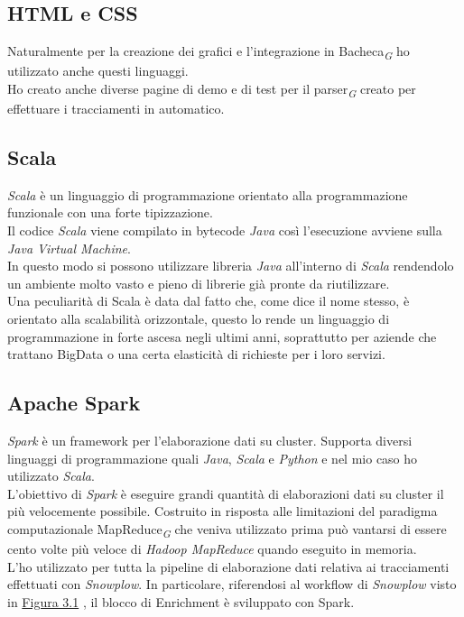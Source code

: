 \documentclass[a4paper, 12pt, twoside, openright]{book}
\newcommand{\gloss}[1]{#1\textsubscript{\textit{\tiny{G}}}}
\begin{document}
\subsection{HTML e CSS}
Naturalmente per la creazione dei grafici e l'integrazione in \gloss{Bacheca} ho utilizzato anche questi linguaggi.\\Ho creato anche diverse pagine di demo e di test per il \gloss{parser} creato per effettuare i tracciamenti in automatico.\\

\subsection{Scala}
\textit{Scala} è un linguaggio di programmazione orientato alla programmazione funzionale con una forte tipizzazione.\\
Il codice \textit{Scala} viene compilato in bytecode \textit{Java} così l'esecuzione avviene sulla \textit{Java Virtual Machine}.\\
In questo modo si possono utilizzare libreria \textit{Java} all'interno di \textit{Scala} rendendolo un ambiente molto vasto e pieno di librerie già pronte da riutilizzare.\\
Una peculiarità di Scala è data dal fatto che, come dice il nome stesso, è orientato alla scalabilità orizzontale, questo lo rende un linguaggio di programmazione in forte ascesa negli ultimi anni, soprattutto per aziende che trattano BigData o una certa elasticità di richieste per i loro servizi.\\

\subsection{Apache Spark}
\textit{Spark} è un framework per l'elaborazione dati su cluster. Supporta diversi linguaggi di programmazione quali \textit{Java}, \textit{Scala} e \textit{Python} e nel mio caso ho utilizzato \textit{Scala}.\\
L'obiettivo di \textit{Spark} è eseguire grandi quantità di elaborazioni dati su cluster il più velocemente possibile. Costruito in risposta alle limitazioni del paradigma computazionale \gloss{MapReduce} che veniva utilizzato prima può vantarsi di essere cento volte più veloce di \textit{Hadoop MapReduce} quando eseguito in memoria.\\

L'ho utilizzato per tutta la pipeline di elaborazione dati relativa ai tracciamenti effettuati con \textit{Snowplow}. In particolare, riferendosi al workflow di \textit{Snowplow} visto in \hyperref[snowplow-workflow]{Figura 3.1}
, il blocco di Enrichment è sviluppato con Spark.\\
\end{document}
